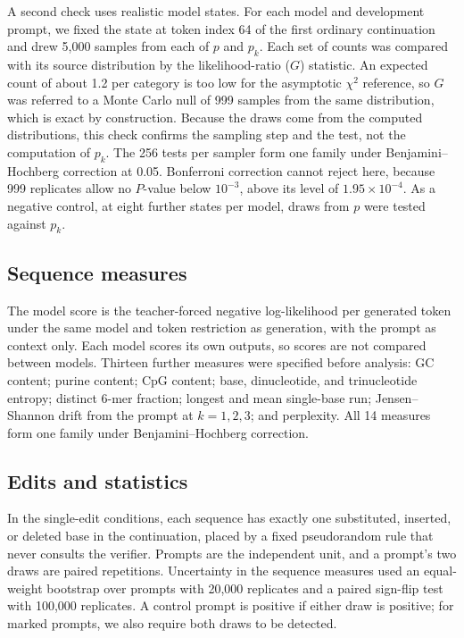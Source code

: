 \documentclass[10pt,twocolumn]{article}
\begin{document}
A second check uses realistic model states. For each model and development prompt, we fixed the
state at token index 64 of the first ordinary continuation and drew 5{,}000 samples from each of
$p$ and $p_k$. Each set of counts was compared with its source distribution by the likelihood-ratio
($G$) statistic. An expected count of about 1.2 per category is too low for the asymptotic
$\chi^2$ reference, so $G$ was referred to a Monte Carlo null of 999 samples from the same
distribution, which is exact by construction. Because the draws come from the computed
distributions, this check confirms the sampling step and the test, not the computation of $p_k$.
The 256 tests per sampler form one family under Benjamini--Hochberg correction at 0.05. Bonferroni
correction cannot reject here, because 999 replicates allow no $P$-value below $10^{-3}$, above its
level of $1.95 \times 10^{-4}$. As a negative control, at eight further states per model, draws
from $p$ were tested against $p_k$.

\subsection{Sequence measures}

The model score is the teacher-forced negative log-likelihood per generated token under the same
model and token restriction as generation, with the prompt as context only. Each model scores its
own outputs, so scores are not compared between models. Thirteen further measures were specified
before analysis: GC content; purine content; CpG content; base, dinucleotide, and trinucleotide
entropy; distinct 6-mer fraction; longest and mean single-base run; Jensen--Shannon drift from the
prompt at $k = 1, 2, 3$; and perplexity. All 14 measures form one family under
Benjamini--Hochberg correction.

\subsection{Edits and statistics}

In the single-edit conditions, each sequence has exactly one substituted, inserted, or deleted base in
the continuation, placed by a fixed pseudorandom rule that never consults the verifier. Prompts are
the independent unit, and a prompt's two draws are paired repetitions. Uncertainty in the sequence
measures used an equal-weight bootstrap over prompts with 20{,}000 replicates and a paired
sign-flip test with 100{,}000 replicates. A control prompt is positive if either draw is positive;
for marked prompts, we also require both draws to be detected.
\end{document}
